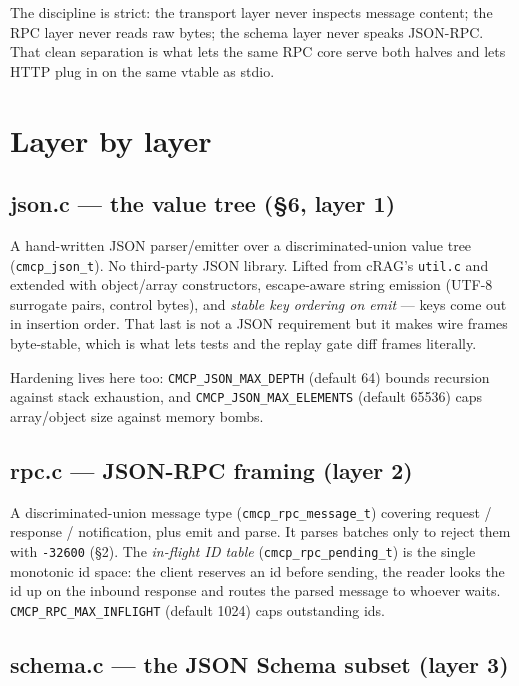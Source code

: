 \documentclass[10pt]{article}
\newcommand{\code}[1]{\texttt{\small #1}}
\begin{document}
The discipline is strict: the transport layer never inspects message content; the
RPC layer never reads raw bytes; the schema layer never speaks JSON-RPC. That
clean separation is what lets the same RPC core serve both halves and lets HTTP
plug in on the same vtable as stdio.

\section{Layer by layer}

\subsection{json.c --- the value tree (\S6, layer 1)}

A hand-written JSON parser/emitter over a discriminated-union value tree
(\code{cmcp\_json\_t}). No third-party JSON library. Lifted from cRAG's
\code{util.c} and extended with object/array constructors, escape-aware string
emission (UTF-8 surrogate pairs, control bytes), and \emph{stable key ordering on
emit} --- keys come out in insertion order. That last is not a JSON requirement
but it makes wire frames byte-stable, which is what lets tests and the replay gate
diff frames literally.

Hardening lives here too: \code{CMCP\_JSON\_MAX\_DEPTH} (default 64) bounds
recursion against stack exhaustion, and \code{CMCP\_JSON\_MAX\_ELEMENTS} (default
65536) caps array/object size against memory bombs.

\subsection{rpc.c --- JSON-RPC framing (layer 2)}

A discriminated-union message type (\code{cmcp\_rpc\_message\_t}) covering
request / response / notification, plus emit and parse. It parses batches only to
reject them with \code{-32600} (\S2). The \emph{in-flight ID table}
(\code{cmcp\_rpc\_pending\_t}) is the single monotonic id space: the client
reserves an id before sending, the reader looks the id up on the inbound response
and routes the parsed message to whoever waits. \code{CMCP\_RPC\_MAX\_INFLIGHT}
(default 1024) caps outstanding ids.

\subsection{schema.c --- the JSON Schema subset (layer 3)}
\end{document}
